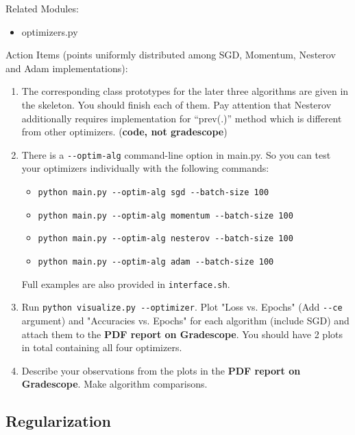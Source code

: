 \hfill



\noindent Related Modules: 
\begin{itemize}
\item optimizers.py
\end{itemize}

\noindent  Action Items (points uniformly distributed among SGD, Momentum, Nesterov and Adam implementations):
\begin{enumerate}

\item The corresponding class prototypes for the later three algorithms are given in the skeleton. You should finish each of them.
Pay attention that Nesterov additionally requires implementation for ``prev(.)'' method which is different from other optimizers.
({\bf code, not gradescope})

\item There is a \verb|--optim-alg| command-line option in main.py. So you can test your optimizers individually with the following commands:
    \begin{itemize}
    \item \verb|python main.py --optim-alg sgd --batch-size 100|
    \item \verb|python main.py --optim-alg momentum --batch-size 100|
    \item \verb|python main.py --optim-alg nesterov --batch-size 100|
    \item \verb|python main.py --optim-alg adam --batch-size 100|
    \end{itemize}
Full examples are also provided in \texttt{interface.sh}.

\item Run \verb|python visualize.py --optimizer|. Plot "Loss vs. Epochs" (Add \verb|--ce| argument) and "Accuracies vs. Epochs" for each algorithm (include SGD) and attach them to the {\bf PDF report on Gradescope}. You should have 2 plots in total containing all four optimizers.

\item Describe your observations from the plots in the {\bf PDF report on Gradescope}. Make algorithm comparisons.

\end{enumerate}

\subsection{Regularization}


